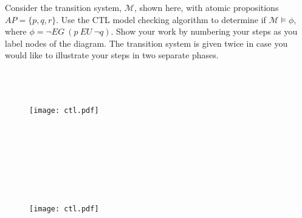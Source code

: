 \documentclass[12pt]{article}
\newenvironment{problem}[2][Problem]{\begin{trivlist}
\item[\hskip \labelsep {\bfseries #1}\hskip \labelsep {\bfseries #2.}]}{\end{trivlist}}
\begin{document}
\begin{problem}{CTL Model Checking (20 points)} Consider the transition system, $\mathcal{M}$, shown here, with atomic propositions $AP = \{p, q, r\}$. Use the CTL model checking algorithm to determine if $\mathcal{M} \models \phi$, where $\phi = \neg EG \ ( p \ EU \ \neg q )$. Show your work by numbering your steps as you label nodes of the diagram. The transition system is given twice in case you would like to illustrate your steps in two separate phases.\\ \\ \\ \\

\begin{figure}[!h]
\centering
\texttt{[image: ctl.pdf]}
\end{figure} 

\newpage
~ \\ \\ \\ \\ \\ \\
\begin{figure}[!h]
\centering
\texttt{[image: ctl.pdf]}
\end{figure}

\end{problem}

\newpage
\end{document}
